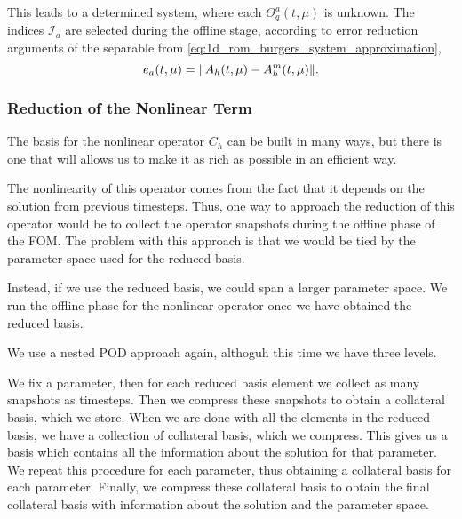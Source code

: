 \documentclass[../../thesis.tex]{subfiles}
\begin{document}
This leads to a determined system, where each $\Theta_q^a(t, \mu)$ is unknown.
The indices $\mathcal{I}_a$ are selected during the offline stage, 
according to error reduction arguments of the separable from \eqref{eq:1d_rom_burgers_system_approximation},
\begin{equation}
    e_a(t, \mu) = \norm{A_h(t, \mu) - A_h^m(t, \mu)}.
\end{equation}

\subsubsection{Reduction of the Nonlinear Term}
The basis for the nonlinear operator $C_h$ can be built in many ways,
but there is one that will allows us to make it as rich as possible in an efficient
way. 

The nonlinearity of this operator comes from the fact that it depends on the solution 
from previous timesteps. 
Thus, one way to approach the reduction of this operator would be to collect 
the operator snapshots during the offline phase of the FOM.
The problem with this approach is that we would be tied by the parameter space 
used for the reduced basis. 

Instead, if we use the reduced basis, we could span a larger parameter space.
We run the offline phase for the nonlinear operator once we have obtained the 
reduced basis. 

We use a nested POD approach again, althoguh this time we have three levels.

We fix a parameter, then for each reduced basis element we collect as many snapshots
as timesteps.
Then we compress these snapshots to obtain a collateral basis, which we store.
When we are done with all the elements in the reduced basis, 
we have a collection of collateral basis, which we compress.
This gives us a basis which contains all the information about the solution for 
that parameter.
We repeat this procedure for each parameter, thus obtaining a collateral basis 
for each parameter.
Finally, we compress these collateral basis to obtain the final collateral basis
with information about the solution and the parameter space. 

\end{document}
